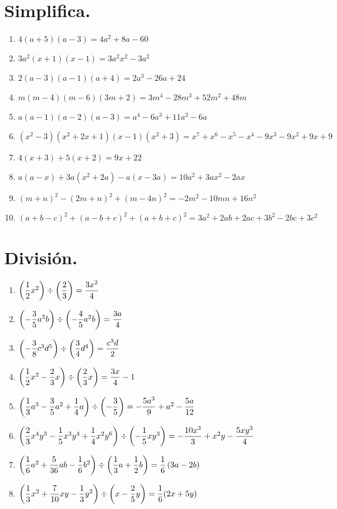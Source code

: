 \documentclass[12pt]{article}
\begin{document}
\section{Simplifica.}

\begin{enumerate}
\item $4 (a + 5)(a - 3) = 4 a^2 + 8 a - 60$
\item $3 a^{2} (x + 1)(x - 1) = 3 a^2 x^2 - 3 a^2$
\item $2 (a - 3)(a - 1)(a + 4) = 2 a^3 - 26 a + 24$
\item $m (m - 4)(m - 6)(3 m + 2) = 3 m^4 - 28 m^3 + 52 m^2 + 48 m$
\item $a (a - 1)(a - 2)(a - 3) = a^4 - 6 a^3 + 11 a^2 - 6 a$
\item $(x^{2} - 3)(x^{2} + 2 x + 1)(x - 1)(x^{2} + 3) = x^7 + x^6 - x^5 - x^4 - 9 x^3 - 9 x^2 + 9 x + 9$
\item $4 (x + 3) +  5 (x + 2) = 9 x + 22$
\item $a (a - x) +  3 a (x^{2} + 2 a) - a (x - 3 a) = 10 a^2 + 3 a x^2 - 2 a x$
\item $(m + n)^{2} - (2 m + n)^{2} + (m - 4 n)^{2} = -2 m^2 - 10 m n + 16 n^2$
\item $(a + b - c)^{2} + (a - b + c)^{2} + (a + b + c)^{2} = 3 a^2 + 2 a b + 2 a c + 3 b^2 - 2 b c + 3 c^2$
\end{enumerate}

\section{División.}

\begin{enumerate}
\item $\left( \dfrac{1}{2} x^{2} \right) \divisionsymbol \left( \dfrac{2}{3} \right) = \dfrac{3 x^2}{4}$
\item $\left( - \dfrac{3}{5} a^{3} b \right) \divisionsymbol \left( - \dfrac{4}{5} a^{2} b \right) = \dfrac{3 a}{4}$
\item $\left( - \dfrac{3}{8} c^{3} d^{5} \right) \divisionsymbol \left( \dfrac{3}{4} d^{4} \right) = \dfrac{c^3 d}{2}$
\item $\left( \dfrac{1}{2} x^{2} - \dfrac{2}{3} x \right) \divisionsymbol \left( \dfrac{2}{3} x \right) = \dfrac{3 x}{4} - 1$
\item $\left( \dfrac{1}{3} a^{3} - \dfrac{3}{5} a^{2} + \dfrac{1}{4} a \right) \divisionsymbol \left( - \dfrac{3}{5} \right) = -\dfrac{5 a^3}{9} + a^2 - \dfrac{5 a}{12}$
\item $\left( \dfrac{2}{3} x^{4} y^{3} - \dfrac{1}{5} x^{3} y^{4} + \dfrac{1}{4} x^{2} y^{6} \right) \divisionsymbol \left( - \dfrac{1}{5} x y^{3} \right) = -\dfrac{10 x^3}{3} + x^2 y - \dfrac{5 x y^3}{4}$
\item $\left( \dfrac{1}{6} a^{2} + \dfrac{5}{36} a b - \dfrac{1}{6} b^{2} \right) \divisionsymbol \left( \dfrac{1}{3} a + \dfrac{1}{2} b \right) = \dfrac{1}{6} \, (3 a-2 b)$
\item $\left( \dfrac{1}{3} x^{2} + \dfrac{7}{10} x y - \dfrac{1}{3} y^{2} \right) \divisionsymbol \left( x - \dfrac{2}{5} y \right) = \dfrac{1}{6} (2 x + 5 y)$
\end{enumerate}
\end{document}
